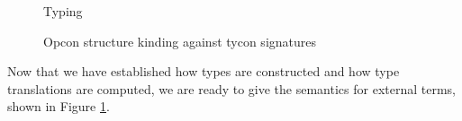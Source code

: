 \begin{figure}[p]
\begin{mathpar}

\vspace{-5px}
\end{mathpar}
\caption{Typing}
\label{typing}\vspace{-8px}
\end{figure}
\begin{figure}[p]
\small\fbox{$\vdash_\Phi \omega \sim \psi$}
\vspace{-25px}
\begin{mathpar}\small
\hspace{50px}

\vspace{-5px}
\end{mathpar}
\caption{Opcon structure kinding against tycon signatures}
\label{ocstruct}\vspace{-5px}
\end{figure}
\noindent 
Now that we have established how types are constructed and how type translations are computed, we are ready to give the semantics for external terms, shown in Figure \ref{typing}.

